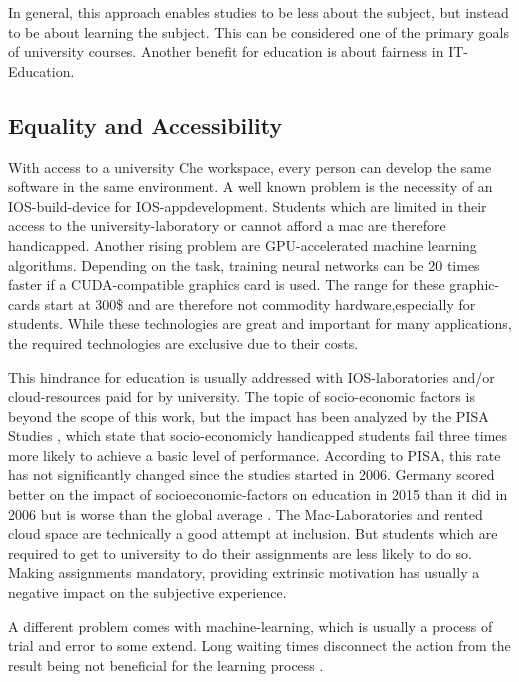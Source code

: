 \documentclass[english,utf8]{lni}
\begin{document}
In general, this approach enables studies to be less about the subject, but instead to be about learning the subject. 
This can be considered one of the primary goals of university courses. 
Another benefit for education is about fairness in IT-Education.  

\subsection{Equality and Accessibility}
With access to a university Che workspace, every person can develop the same software in the same environment. 
A well known problem is the necessity of an IOS-build-device for IOS-appdevelopment.
Students which are limited in their access to the university-laboratory or cannot afford a mac are therefore handicapped.
Another  rising  problem  are  GPU-accelerated  machine learning algorithms. 
Depending on the task, training neural networks can be 20 times faster if a CUDA-compatible graphics card is used. 
The range for these graphic-cards start at 300\$ and are therefore not commodity hardware,especially for students.  
While these technologies are great and important for many applications, the required technologies are exclusive due to  their  costs.

This  hindrance  for  education  is  usually addressed  with  IOS-laboratories  and/or  cloud-resources paid for by university. 
The topic of socio-economic factors is beyond the scope of this work, but the impact has been analyzed by the PISA Studies \cite{PISA15}, which state that socio-economicly handicapped students fail three times more likely to achieve a basic level of performance.
According to PISA, this rate has not significantly changed since the studies started in 2006. 
Germany scored better on the impact of socioeconomic-factors on education in 2015 than it did in 2006 but is worse than the global average \cite{OECDCN15}.
The Mac-Laboratories and rented cloud space are technically a good attempt at inclusion. 
But students which are required to get to university to do their assignments are 
less  likely  to  do  so.
Making  assignments  mandatory, providing extrinsic motivation \cite{DECI93} has usually a negative impact on the subjective experience.

A different problem comes with machine-learning, which is usually a process of trial and error to some extend.
Long waiting times disconnect the action from the result being not beneficial for the learning process \cite{HU95}\cite{DECI93}. 
\end{document}
